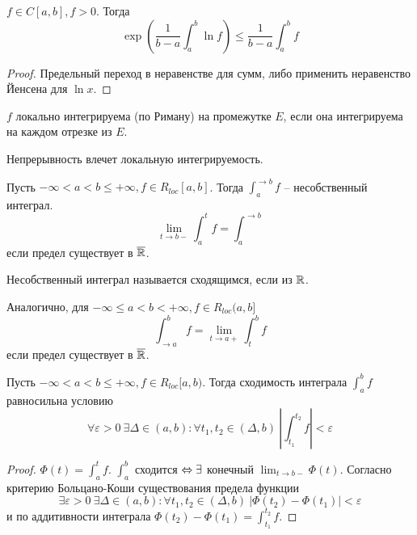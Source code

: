 \begin{Thm}
	$f \in C[a, b], f > 0$. Тогда 
	\[\exp\left(\frac{1}{b - a}\int_a^b \ln f\right) \leqslant \frac{1}{b - a}\int_a^b f\]
\end{Thm}

\begin{proof}
	Предельный переход в неравенстве для сумм, либо применить неравенство Йенсена для $\ln x$.
\end{proof}


\begin{Def}
	$f$ локально интегрируема (по Риману) на промежутке $E$, если она интегрируема на каждом отрезке из $E$.
\end{Def}

\begin{Rem}
	Непрерывность влечет локальную интегрируемость.
\end{Rem}

\begin{Def}
	Пусть $-\infty < a < b \leqslant +\infty, f \in R_{loc}[a, b]$. Тогда
	$\int_a^{\to b}f$ -- несобственный интеграл. 
	\[\lim_{t \to b-} \int_a^t f = \int_a^{\to b}\]
	если предел существует в $\overline{\mathbb{R}}$. 
\end{Def}

\begin{Def}
	Несобственный интеграл называется сходящимся, если из $\mathbb{R}$. 
\end{Def}

\begin{Def}
	Аналогично, для $-\infty \leqslant a < b < +\infty, f \in R_{loc}(a, b]$ 
	\[\int_{\to a}^b f = \lim_{t \to a+} \int_t^b f\]
	если предел существует в $\overline{\mathbb{R}}$.  
\end{Def}

\begin{Thm}
	Пусть $-\infty < a < b \leqslant +\infty, f \in R_{loc}[a, b)$. Тогда сходимость интеграла $\int_a^b f$ равносильна условию
	\[\forall \varepsilon > 0 \ \exists \Delta \in (a, b) : \forall t_1, t_2 \in (\Delta, b) \ \left|\int_{t_1}^{t_2} f\right| < \varepsilon\]	
\end{Thm}

\begin{proof}
	$\Phi (t) = \int_a^t f$. $\int_a^b$ сходится $\Leftrightarrow \exists$ конечный $\lim_{t \to b-} \Phi (t)$.
	Согласно критерию Больцано-Коши существования предела функции
	\[\exists \varepsilon > 0 \ \exists \Delta \in (a, b) : \forall t_1, t_2 \in (\Delta, b) \ |\Phi(t_2) - \Phi(t_1)| < \varepsilon\]
	и по аддитивности интеграла $\Phi(t_2) - \Phi(t_1) = \int_{t_1}^{t_2} f$.
\end{proof}


